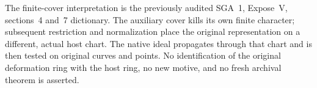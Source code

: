 The finite-cover interpretation is the previously audited
SGA~1, Expose~V, sections~4 and~7 dictionary.
The auxiliary cover kills its own finite character; subsequent
restriction and normalization place the original representation
on a different, actual host chart.  The native ideal propagates
through that chart and is then tested on original curves and
points.  No identification of the original deformation ring
with the host ring, no new motive, and no fresh archival theorem
is asserted.
